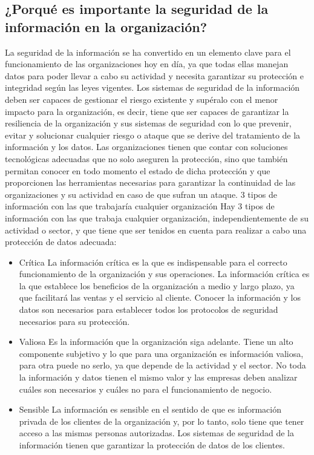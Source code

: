 \documentclass[12pt]{article}
\begin{document}
\subsection*{¿Porqué es importante la seguridad de la información en la organización?}
La seguridad de la información se ha convertido en un elemento clave para el funcionamiento de las organizaciones hoy en día, ya que todas ellas manejan datos para poder llevar a cabo su actividad y necesita garantizar su protección e integridad según las leyes vigentes.
Los sistemas de seguridad de la información deben ser capaces de gestionar el riesgo existente y supéralo con el menor impacto para la organización, es decir, tiene que ser capaces de garantizar la resiliencia de la organización y sus sistemas de seguridad con lo que prevenir, evitar y solucionar cualquier riesgo o ataque que se derive del tratamiento de la información y los datos.
Las organizaciones tienen que contar con soluciones tecnológicas adecuadas que no solo aseguren la protección, sino que también permitan conocer en todo momento el estado de dicha protección y que proporcionen las herramientas necesarias para garantizar la continuidad de las organizaciones y su actividad en caso de que sufran un ataque.
3 tipos de información con las que trabajaría cualquier organización
Hay 3 tipos de información con las que trabaja cualquier organización, independientemente de su actividad o sector, y que tiene que ser tenidos en cuenta para realizar a cabo una protección de datos adecuada:


\begin{itemize}
    \item Crítica
La información crítica es la que es indispensable para el correcto funcionamiento de la organización y sus operaciones. La información crítica es la que establece los beneficios de la organización a medio y largo plazo, ya que facilitará las ventas y el servicio al cliente.
Conocer la información y los datos son necesarios para establecer todos los protocolos de seguridad necesarios para su protección.

    \item Valiosa
Es la información que la organización siga adelante. Tiene un alto componente subjetivo y lo que para una organización es información valiosa, para otra puede no serlo, ya que depende de la actividad y el sector.
No toda la información y datos tienen el mismo valor y las empresas deben analizar cuáles son necesarios y cuáles no para el funcionamiento de negocio.

    \item Sensible
La información es sensible en el sentido de que es información privada de los clientes de la organización y, por lo tanto, solo tiene que tener acceso a las mismas personas autorizadas. Los sistemas de seguridad de la información tienen que garantizar la protección de datos de los clientes.

\end{itemize}
\end{document}
